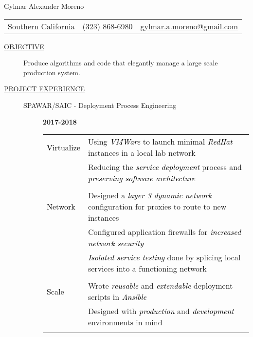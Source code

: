\documentclass[12pt]{article}
\begin{document}
    \begin{center}
        {\LARGE Gylmar Alexander Moreno}
	\\
        \begin{tabular}{l|l|l}
            Southern California & (323) 868-6980 &
            \href{mailto:gylmar.a.moreno@gmail.com}{gylmar.a.moreno@gmail.com}
        \end{tabular}
    \end{center}

    \begin{description}
        \item[\underline{OBJECTIVE}] Produce algorithms and code that elegantly manage a large scale production system.
            \iffalse Produce algorithms and code that elegantly manage a large scale production system that\fi
        \item[\underline{PROJECT EXPERIENCE}] \hfill
            \begin{description}
                \item[SPAWAR/SAIC - Deployment Process Engineering] \hfill \textbf{2017-2018}\\
		\textcolor{gray}{
			\begin{tabular}{l|l}
					    \\[-1.0mm]
				\textcolor{black}{Virtualize} & Using \textcolor{black}{\textit{VMWare}} to launch minimal \textcolor{black}{\textit{RedHat}} instances in a local lab network\\
					   & Reducing the \textcolor{black}{\textit{service deployment}} process and \textcolor{black}{\textit{preserving software architecture}}\\
					    \\[-1.7mm]
				\textcolor{black}{Network}   & Designed a \textcolor{black}{\textit{layer 3 dynamic network}} configuration for proxies to route to new instances\\
					   & Configured application firewalls for \textcolor{black}{\textit{increased network security}}\\
					   & \textcolor{black}{\textit{Isolated service testing}} done by splicing local services into a functioning network\\
					    \\[-1.7mm]
				\textcolor{black}{Scale}   & Wrote \textcolor{black}{\textit{reusable}} and \textcolor{black}{\textit{extendable}} deployment scripts in \textcolor{black}{\textit{Ansible}}\\
					   & Designed with \textcolor{black}{\textit{production}} and \textcolor{black}{\textit{development}} environments in mind\\
					    \\[-1.0mm]
		    	\end{tabular}
	    	}


\end{description}
\end{description}
\end{document}
